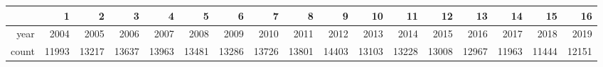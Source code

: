 \begin{table}[ht]
\centering
\begin{tabular}{rrrrrrrrrrrrrrrrr}
  \hline
 & 1 & 2 & 3 & 4 & 5 & 6 & 7 & 8 & 9 & 10 & 11 & 12 & 13 & 14 & 15 & 16 \\ 
  \hline
year & 2004 & 2005 & 2006 & 2007 & 2008 & 2009 & 2010 & 2011 & 2012 & 2013 & 2014 & 2015 & 2016 & 2017 & 2018 & 2019 \\ 
  count & 11993 & 13217 & 13637 & 13963 & 13481 & 13286 & 13726 & 13801 & 14403 & 13103 & 13228 & 13008 & 12967 & 11963 & 11444 & 12151 \\ 
   \hline
\end{tabular}
\end{table}
